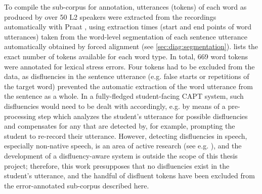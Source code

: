 	To compile the sub-corpus for annotation, utterances (tokens) of each word as produced by over 50 L2 speakers were extracted from the recordings automatically with Praat \parencite{Boersma2014}, using extraction times (start and end points of word utterances) taken from the word-level segmentation of each sentence utterance automatically obtained by forced alignment (see \cref{sec:diag:segmentation}).
	 lists the exact number of tokens available for each word type. In total, 669 word tokens were annotated for lexical stress errors. 
	Four tokens had to be excluded from the data, as disfluencies in the sentence utterance (e.g. false starts or repetitions of the target word) prevented the automatic extraction of the word utterance from the sentence as a whole. In a fully-fledged student-facing CAPT system, such disfluencies would need to be dealt with accordingly, e.g. by means of a pre-processing step which analyzes the student's utterance for possible disfluencies and compensates for any that are detected by, for example, prompting the student to re-record their utterance. However, detecting disfluencies in speech, especially non-native speech, is an area of active research (see e.g. ), and the development of a  disfluency-aware system is outside the scope of this thesis project; therefore, this work presupposes that no disfluencies exist in the student's utterance, and the handful of disfluent tokens have been excluded from the error-annotated sub-corpus described here.
	
